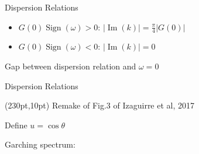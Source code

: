 \documentclass[9pt]{beamer}
\begin{document}
\begin{darkframes}
\begin{frame}{Dispersion Relations}
\pause

\begin{itemize}
   \item $G(0) \operatorname{Sign}(\omega) > 0$: $\lvert \operatorname{Im}(k) \rvert  =  \frac{\pi}{4}\lvert G(0)\rvert$
   \item $G(0) \operatorname{Sign}(\omega) < 0$: $\lvert \operatorname{Im}(k) \rvert  = 0$
\end{itemize}

\pause
\begin{tcolorbox}
   Gap between dispersion relation and $\omega=0$
\end{tcolorbox}


%
%




\end{frame}

\begin{frame}{Dispersion Relations}


       \begin{textblock*}{100pt}(230pt,10pt)
           Remake of Fig.3 of Izaguirre et al, 2017
       \end{textblock*}

Define $u=\cos\theta$

Garching spectrum:


\end{frame}
\end{darkframes}
\end{document}
